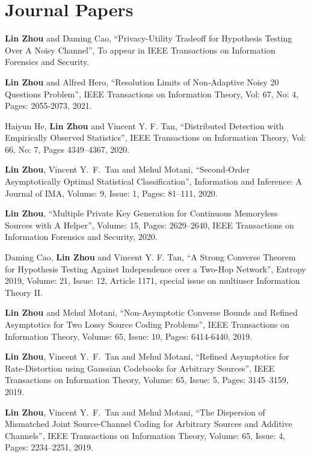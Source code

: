 \documentclass[12pt]{article} %
\begin{document}
\section{Journal Papers}
\begin{etaremune}
\item \textbf{Lin Zhou} and Daming Cao, ``Privacy-Utility Tradeoff for Hypothesis Testing  Over A Noisy Channel'', To appear in IEEE Transactions on Information Forensics and Security.
\item \textbf{Lin Zhou} and Alfred Hero, ``Resolution Limits of Non-Adaptive Noisy 20 Questions Problem'', IEEE Transactions on Information Theory, Vol: 67, No: 4, Pages: 2055-2073, 2021.
\item Haiyun He, \textbf{Lin Zhou} and Vincent Y. F. Tan, ``Distributed Detection with Empirically Observed Statistics'', IEEE Transactions on Information Theory, Vol: 66, No: 7, Pages 4349--4367, 2020.
\item \textbf{Lin Zhou}, Vincent Y.\ F.\ Tan and Mehul Motani,  ``Second-Order Asymptotically Optimal Statistical Classification'', Information and Inference: A Journal of IMA, Volume: 9, Issue: 1, Pages: 81--111, 2020.
\item \textbf{Lin Zhou}, ``Multiple Private Key Generation for Continuous Memoryless Sources with A Helper'', Volume: 15, Pages: 2629--2640, IEEE Transactions on Information Forensics and Security, 2020.
\item Daming Cao, \textbf{Lin Zhou} and Vincent Y. F. Tan, ``A Strong Converse Theorem for Hypothesis Testing Against Independence over a Two-Hop Network'', Entropy 2019, Volume: 21, Issue: 12, Article 1171, special issue on multiuser Information Theory II.
\item \textbf{Lin Zhou} and Mehul Motani,  ``Non-Asymptotic Converse Bounds and Refined Asymptotics for Two Lossy Source Coding Problems'', IEEE Transactions on Information Theory, Volume: 65, Issue: 10, Pages: 6414-6440, 2019.
\item \textbf{Lin Zhou}, Vincent Y.\ F.\ Tan and Mehul Motani,  ``Refined Asymptotics for Rate-Distortion using Gaussian Codebooks for Arbitrary Sources'', IEEE Transactions on Information Theory, Volume: 65, Issue: 5, Pages: 3145--3159, 2019.
\item \textbf{Lin Zhou}, Vincent Y.\ F.\ Tan and Mehul Motani,  ``The Dispersion of Mismatched Joint Source-Channel Coding for Arbitrary Sources and Additive Channels'', IEEE Transactions on Information Theory, Volume: 65, Issue: 4, Pages: 2234--2251, 2019.

\end{etaremune}
\end{document}
